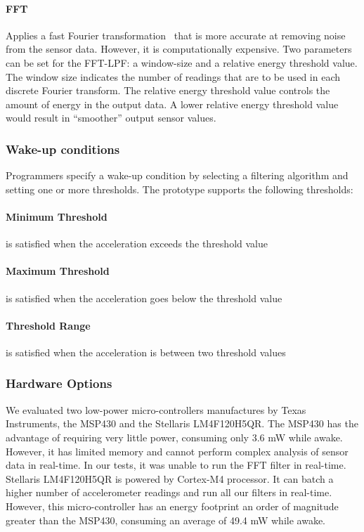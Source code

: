 \paragraph{FFT} Applies a fast Fourier
  transformation~\cite{libbyFootstepDetection} that is more accurate
  at removing noise from the sensor data. However, it is
  computationally expensive. Two parameters can be set for the
  FFT-LPF: a window-size and a relative energy threshold value. The
  window size indicates the number of readings that are to be used in
  each discrete Fourier transform. The relative energy threshold value
  controls the amount of energy in the output data. A lower relative
  energy threshold value would result in ``smoother'' output sensor
  values.

\subsubsection{Wake-up conditions}

Programmers specify a wake-up condition by selecting a filtering
algorithm and setting one or more thresholds.  The prototype supports
the following thresholds:

\paragraph{Minimum Threshold} is satisfied when the acceleration exceeds the threshold value

\paragraph{Maximum Threshold} is satisfied when the acceleration goes below the threshold value

\paragraph{Threshold Range} is satisfied when the acceleration is between two threshold values


\subsubsection{Hardware Options}

We evaluated two low-power micro-controllers manufactures by Texas
Instruments, the MSP430 and the Stellaris LM4F120H5QR.  The MSP430 has
the advantage of requiring very little power, consuming only 3.6 mW
while awake. However, it has limited memory and cannot perform complex
analysis of sensor data in real-time. In our tests, it was unable to
run the FFT filter in real-time.  Stellaris LM4F120H5QR is powered by
Cortex-M4 processor. It can batch a higher number of accelerometer
readings and run all our filters in real-time.  However, this
micro-controller has an energy footprint an order of magnitude greater
than the MSP430, consuming an average of 49.4 mW while awake.

